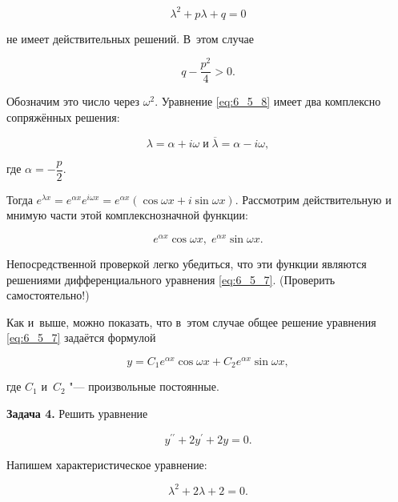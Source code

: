 \begin{equation}\label{eq:6_5_8}
\lambda^{2} + p\lambda + q = 0
\end{equation}

\noindent
не имеет действительных решений. В~этом случае

\begin{equation*}
q - \dfrac{p^{2}}{4} > 0.
\end{equation*}

\noindent
Обозначим это число через $\omega^{2}$. Уравнение \eqref{eq:6_5_8} имеет два комплексно
сопряжённых решения:

\begin{equation*}
\lambda = \alpha + i\omega \; \text{и} \; \overline\lambda = \alpha - i\omega,
\end{equation*}

\noindent
где $\alpha = -\dfrac{p}{2}$.

Тогда
$e^{\lambda x} = e^{\alpha x} e^{i\omega x} = e^{\alpha x} (\cos \omega x + i \sin \omega x)$. 
Рассмотрим действительную и мнимую части этой комплекснозначной функции:

\begin{equation*}
e^{\alpha x} \cos \omega x, \; e^{\alpha x} \sin \omega x. 
\end{equation*}

\noindent
Непосредственной проверкой легко убедиться, что эти функции являются решениями
дифференциального уравнения \eqref{eq:6_5_7}. (Проверить самостоятельно!)

Как и~выше, можно показать, что в~этом случае общее решение уравнения \eqref{eq:6_5_7}
задаётся формулой

\begin{equation}\label{eq:6_5_10}
y = C_{1} e^{\alpha x} \cos \omega x + C_{2} e^{\alpha x} \sin \omega x,
\end{equation}

\noindent
где $C_{1}$ и~$C_{2}$ "--- произвольные постоянные.

\textbf{Задача 4.}\label{ex:6_5_4} Решить уравнение

\begin{equation*}
y^{\prime\prime} + 2y^\prime + 2y = 0.
\end{equation*}

Напишем характеристическое уравнение:

\begin{equation*}
\lambda^{2} + 2\lambda + 2 = 0.
\end{equation*}

